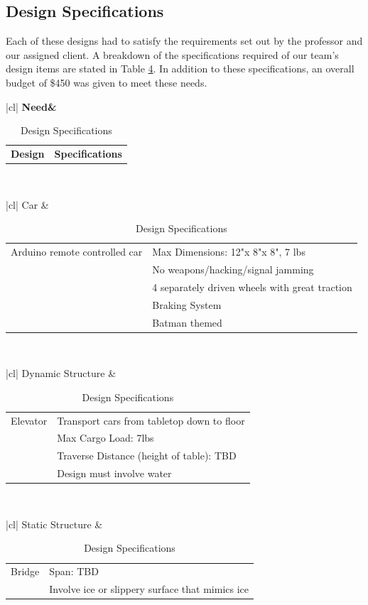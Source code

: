 \documentclass[fleqn,12pt]{project}
\begin{document}
\subsection{Design Specifications}

Each of these designs had to satisfy the requirements set out by the professor and our assigned client. A breakdown of the specifications required of our team's design items are stated in Table \ref{table:Table1}. In addition to these specifications, an overall budget of \$450 was given to meet these needs.  

\begin{table}
\caption{Design Specifications}
\begin{center}
\small
\begin{tabular}{|cl|}
\hline
\bf{Need}\phantom{11000000000}&
\begin{tabular}{|p{5.5cm}|p{7cm}}
\bf{Design} & \bf{Specifications} \\
\end{tabular}\\
\hline
\end{tabular}
\begin{tabular}{|cl|}
\hline
Car \phantom{110000000000} &
\begin{tabular}{|p{5.5cm}|p{7cm}}
Arduino remote controlled car & Max Dimensions: 12"x 8"x 8", 7 lbs  \\
 & No weapons/hacking/signal jamming    \\
  & 4 separately driven wheels with great traction    \\
   &  Braking System   \\
    & Batman themed    \\
 \end{tabular}\\
\hline
\end{tabular}
\begin{tabular}{|cl|}
\hline
Dynamic Structure &
\begin{tabular}{|p{5.5cm}|p{7cm}}
 Elevator & Transport cars from tabletop down to floor    \\
  & Max Cargo Load: 7lbs    \\
  & Traverse Distance (height of table): TBD    \\
  & Design must involve water  \\
 \end{tabular}\\
\hline
\end{tabular}
\begin{tabular}{|cl|}
\hline
Static Structure \phantom{N0}&
\begin{tabular}{|p{5.5cm}|p{7cm}}
 Bridge  & Span: TBD \\
   & Involve ice or slippery surface that mimics ice    \\
 \end{tabular}\\
\hline
\end{tabular}
\end{center}
\label{table:Table1}
\end{table}
\end{document}

